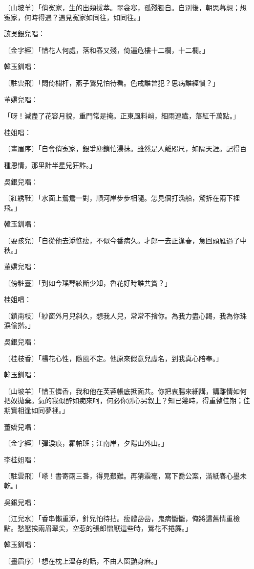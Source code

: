 〔山坡羊〕「俏寃家，生的出類拔萃。翠衾寒，孤殘獨自。自別後，朝思暮想；想寃家，何時得遇？遇見寃家如同往，如同往。」

該吳銀兒唱：

〔金字經〕「惜花人何處，落和春又殘，倚遍危樓十二欄，十二欄。」

韓玉釧唱：

〔駐雲飛〕「悶倚欄杆，燕子鶯兒怕待看。色戒誰曾犯？思病誰經慣？」

董嬌兒唱：

「呀！減盡了花容月貌，重門常是掩。正東風料峭，細雨連纎，落紅千萬點。」

桂姐唱：

〔畫眉序〕「自會俏寃家，銀爭塵鎖怕湯抹。雖然是人離咫尺，如隔天涯。記得百

種恩情，那里計半星兒狂詐。」

吳銀兒唱：

〔紅綉鞋〕「水面上鴛鴦一對，順河岸步步相隨。怎見個打漁船，驚拆在兩下裡飛。」

韓玉釧唱：

〔耍孩兒〕「自從他去添憔瘦，不似今番病久。才郎一去正逢春，急回頭雁過了中秋。」

董嬌兒唱：

〔傍粧臺〕「到如今瑤琴絃斷少知，魯花好時誰共賞？」

桂姐唱：

〔鎖南枝〕「紗窗外月兒斜久，想我人兒，常常不捨你。為我力盡心謁，我為你珠淚偷揩。」

吳銀兒唱：

〔桂枝香〕「楊花心性，隨風不定。他原來假意兒虛名，到我真心陪奉。」

韓玉釧唱：

〔山坡羊〕「惜玉憐香，我和他在芙蓉帳底抵面共。你把衷腸來細講，講離情如何把奴拋棄。氣的我似醉如痴來呵，何必你別心另叙上？知已幾時，得重整佳期；佳期實相逢如同夢裡。」

董嬌兒唱：

〔金字經〕「彈淚痕，羅帕班；江南岸，夕陽山外山。」

李桂姐唱：

〔駐雲飛〕「嗏！書寄兩三番，得見艱難。再猜霜毫，寫下喬公案，滿紙春心墨未乾。」

吳銀兒唱：

〔江兒水〕「香串懶重添，針兒怕待拈。瘦體嵒嵒，鬼病懨懨，俺將這舊情重檢點。愁壓挨兩眉翠尖，空惹的張郎憎厭這些時，鶯花不捲簾。」

韓玉釧唱：

〔畫眉序〕「想在枕上溫存的話，不由人窗顫身麻。」

